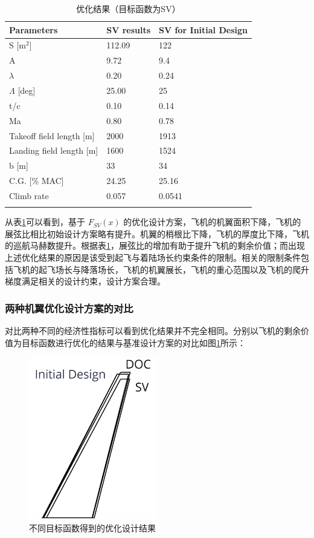 \documentclass[12pt,a4paper]{report}
\begin{document}
\begin{table}[ht!]
\centering
\caption{优化结果（目标函数为SV）}
\begin{tabular}{|p{4.8cm}|p{2.3cm}|p{4.5cm}|}
\hhline{|===|}
Parameters	& SV results & SV for Initial Design \\ \hline
S [m$^2$]	& 112.09	& 122 \\ \hline
A	& 9.72	& 9.4 \\ \hline
$\lambda$	& 0.20	 & 0.24 \\ \hline
$\Lambda$ [deg]	 & 25.00	& 25 \\ \hline
t/c	& 0.10	& 0.14 \\ \hline
Ma	& 0.80	& 0.78 \\ \hline
Takeoff field length [m]	& 2000	& 1913 \\ \hline
Landing field length [m]	& 1600	& 1524 \\ \hline
b [m]	& 33	& 34 \\ \hline
C.G. [\% MAC]	& 24.25	& 25.16 \\ \hline
Climb rate	& 0.057	& 0.0541 \\ \hhline{|===|}
\end{tabular}
\label{wing-results-sv}
\end{table}

从表\ref{wing-results-sv}可以看到，基于 $ F_{SV} \left( x \right)  $ 的优化设计方案，飞机的机翼面积下降，飞机的展弦比相比初始设计方案略有提升。机翼的梢根比下降，飞机的厚度比下降，飞机的巡航马赫数提升。根据表\ref{wing-results-sv}，展弦比的增加有助于提升飞机的剩余价值；而出现上述优化结果的原因是该受到起飞与着陆场长约束条件的限制。相关的限制条件包括飞机的起飞场长与降落场长，飞机的机翼展长，飞机的重心范围以及飞机的爬升梯度满足相关的设计约束，设计方案合理。

\subsubsection{两种机翼优化设计方案的对比}
对比两种不同的经济性指标可以看到优化结果并不完全相同。分别以飞机的剩余价值为目标函数进行优化的结果与基准设计方案的对比如图\ref{wing-comp}所示：

\begin{figure}[ht!]
	\centering
	\includegraphics[width=0.5\textwidth]{./media4/image28.png}
	\caption{不同目标函数得到的优化设计结果}
	\label{wing-comp}	
\end{figure}
\end{document}
